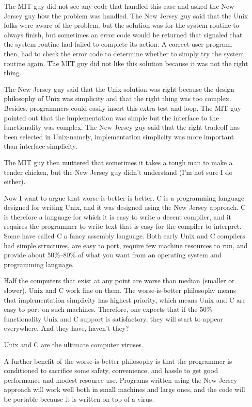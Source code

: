 \documentclass[10pt,twoside,openright]{memoir}
\begin{document}
The MIT guy did not see any code that handled this case and asked the New Jersey guy how the problem was handled. The New Jersey guy said that the Unix folks were aware of the problem, but the solution was for the system routine to always finish, but sometimes an error code would be returned that signaled that the system routine had failed to complete its action. A correct user program, then, had to check the error code to determine whether to simply try the system routine again. The MIT guy did not like this solution because it was not the right thing.

The New Jersey guy said that the Unix solution was right because the design philosophy of Unix was simplicity and that the right thing was too complex. Besides, programmers could easily insert this extra test and loop. The MIT guy pointed out that the implementation was simple but the interface to the functionality was complex. The New Jersey guy said that the right tradeoff has been selected in Unix-namely, implementation simplicity was more important than interface simplicity.

The MIT guy then muttered that sometimes it takes a tough man to make a tender chicken, but the New Jersey guy didn't understand (I'm not sure I do either).

Now I want to argue that worse-is-better is better. C is a programming language designed for writing Unix, and it was designed using the New Jersey approach. C is therefore a language for which it is easy to write a decent compiler, and it requires the programmer to write text that is easy for the compiler to interpret. Some have called C a fancy assembly language. Both early Unix and C compilers had simple structures, are easy to port, require few machine resources to run, and provide about 50\%--80\% of what you want from an operating system and programming language.

Half the computers that exist at any point are worse than median (smaller or slower). Unix and C work fine on them. The worse-is-better philosophy means that implementation simplicity has highest priority, which means Unix and C are easy to port on such machines. Therefore, one expects that if the 50\% functionality Unix and C support is satisfactory, they will start to appear everywhere. And they have, haven't they?

Unix and C are the ultimate computer viruses.

A further benefit of the worse-is-better philosophy is that the programmer is conditioned to sacrifice some safety, convenience, and hassle to get good performance and modest resource use. Programs written using the New Jersey approach will work well both in small machines and large ones, and the code will be portable because it is written on top of a virus.
\end{document}
